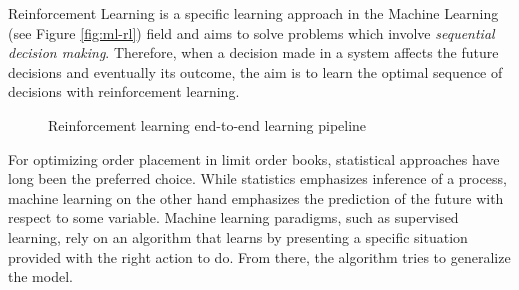 Reinforcement Learning is a specific learning approach in the Machine Learning (see Figure \ref{fig:ml-rl}) field and aims to solve problems which involve \textit{sequential decision making}.
Therefore, when a decision made in a system affects the future decisions and eventually its outcome, the aim is to learn the optimal sequence of decisions with reinforcement learning.

\begin{figure}[H]
    \centering
    \caption{Reinforcement learning end-to-end learning pipeline}
    \label{fig:rl-pipeline}
\end{figure}

For optimizing order placement in limit order books, statistical approaches have long been the preferred choice.
While statistics emphasizes inference of a process, machine learning on the other hand emphasizes the prediction of the future with respect to some variable.
Machine learning paradigms, such as supervised learning, rely on an algorithm that learns by presenting a specific situation provided with the right action to do. 
From there, the algorithm tries to generalize the model.

